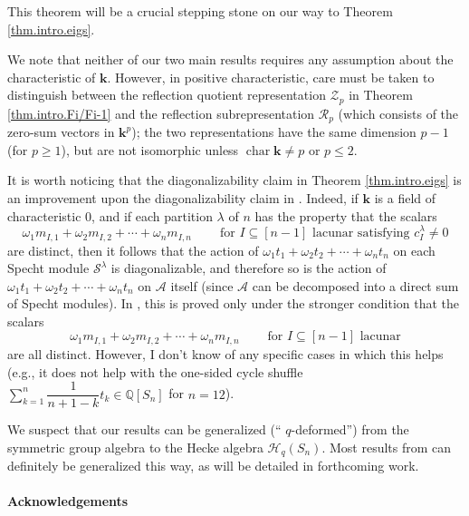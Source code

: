 \documentclass[numbers=enddot,12pt,final,onecolumn,notitlepage]{scrartcl}%
\theoremstyle{definition}
\newenvironment{noncompile}{}{}
\let\sumnonlimits\sum
\renewcommand{\sum}{\sumnonlimits\limits}
\begin{document}
This theorem will be a crucial stepping stone on our way to Theorem
\ref{thm.intro.eigs}.

We note that neither of our two main results requires any assumption about the
characteristic of $\mathbf{k}$. However, in positive characteristic, care must
be taken to distinguish between the reflection quotient representation
$\mathcal{Z}_{p}$ in Theorem \ref{thm.intro.Fi/Fi-1} and the reflection
subrepresentation $\mathcal{R}_{p}$ (which consists of the zero-sum vectors in
$\mathbf{k}^{p}$); the two representations have the same dimension $p-1$ (for
$p\geq1$), but are not isomorphic unless $\operatorname*{char}\mathbf{k}\neq
p$ or $p\leq2$.

\begin{noncompile}
It is worth noticing that the diagonalizability claim in Theorem
\ref{thm.intro.eigs} is an improvement upon the diagonalizability claim in
\cite[Theorem 12.3]{s2b1}. Indeed, if $\mathbf{k}$ is a field of
characteristic $0$, and if each partition $\lambda$ of $n$ has the property
that the scalars%
\[
\omega_{1}m_{I,1}+\omega_{2}m_{I,2}+\cdots+\omega_{n}m_{I,n}%
\ \ \ \ \ \ \ \ \ \ \text{for }I\subseteq\left[  n-1\right]  \text{ lacunar
satisfying }c_{I}^{\lambda}\neq0
\]
are distinct, then it follows that the action of $\omega_{1}t_{1}+\omega
_{2}t_{2}+\cdots+\omega_{n}t_{n}$ on each Specht module $\mathcal{S}^{\lambda
}$ is diagonalizable, and therefore so is the action of $\omega_{1}%
t_{1}+\omega_{2}t_{2}+\cdots+\omega_{n}t_{n}$ on $\mathcal{A}$ itself (since
$\mathcal{A}$ can be decomposed into a direct sum of Specht modules). In
\cite[Theorem 12.3]{s2b1}, this is proved only under the stronger condition
that the scalars%
\[
\omega_{1}m_{I,1}+\omega_{2}m_{I,2}+\cdots+\omega_{n}m_{I,n}%
\ \ \ \ \ \ \ \ \ \ \text{for }I\subseteq\left[  n-1\right]  \text{ lacunar}%
\]
are all distinct. However, I don't know of any specific cases in which this
helps (e.g., it does not help with the one-sided cycle shuffle $\sum_{k=1}%
^{n}\dfrac{1}{n+1-k}t_{k}\in\mathbb{Q}\left[  S_{n}\right]  $ for $n=12$).
\end{noncompile}

We suspect that our results can be generalized (\textquotedblleft%
$q$-deformed\textquotedblright) from the symmetric group algebra to the Hecke
algebra $\mathcal{H}_{q}\left(  S_{n}\right)  $. Most results from \cite{s2b1}
can definitely be generalized this way, as will be detailed in forthcoming work.

\paragraph{Acknowledgements}
\end{document}
